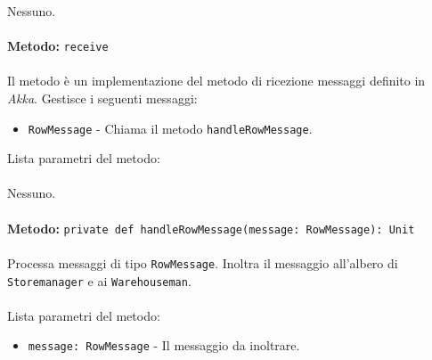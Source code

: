 \documentclass[a4paper]{article}
\begin{document}
			Nessuno.
			\\ \\
		\textbf{Metodo: }\texttt{receive}
			\\ \\
			Il metodo è un implementazione del metodo di ricezione messaggi definito in \emph{Akka}. Gestisce i seguenti messaggi:
			\begin{itemize}
				\item \texttt{RowMessage} - Chiama il metodo \texttt{handleRowMessage}.
			\end{itemize}
			Lista parametri del metodo:
			\\ \\
			Nessuno.
			\\ \\
		\textbf{Metodo: }\texttt{private def handleRowMessage(message: RowMessage): Unit}
			\\ \\
			Processa messaggi di tipo \texttt{RowMessage}. Inoltra il messaggio all'albero di \texttt{Storemanager} e ai \texttt{Warehouseman}.
			\\ \\
			Lista parametri del metodo:
			\begin{itemize}
				\item \texttt{message: RowMessage} - Il messaggio da inoltrare.
			\end{itemize}	
			
			
\end{document}
